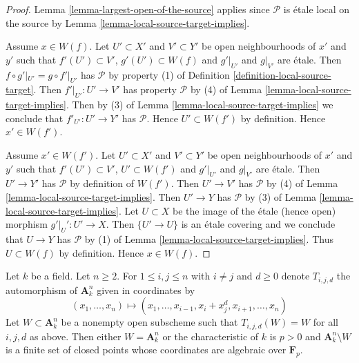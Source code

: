 \begin{proof}
Lemma \ref{lemma-largest-open-of-the-source} applies since
$\mathcal{P}$ is \'etale local on the source by
Lemma \ref{lemma-local-source-target-implies}.

\medskip\noindent
Assume $x \in W(f)$. Let $U' \subset X'$ and $V' \subset Y'$
be open neighbourhoods of $x'$ and $y'$ such that $f'(U') \subset V'$,
$g'(U') \subset W(f)$ and $g'|_{U'}$ and $g|_{V'}$ are \'etale.
Then $f \circ g'|_{U'} = g \circ f'|_{U'}$
has $\mathcal{P}$ by property (1) of
Definition \ref{definition-local-source-target}.
Then $f'|_{U'} : U' \to V'$ has property $\mathcal{P}$
by (4) of Lemma \ref{lemma-local-source-target-implies}.
Then by (3) of Lemma \ref{lemma-local-source-target-implies}
we conclude that $f'_{U'} : U' \to Y'$ has $\mathcal{P}$.
Hence $U' \subset W(f')$ by definition. Hence $x' \in W(f')$.

\medskip\noindent
Assume $x' \in W(f')$. Let $U' \subset X'$ and $V' \subset Y'$
be open neighbourhoods of $x'$ and $y'$ such that $f'(U') \subset V'$,
$U' \subset W(f')$ and $g'|_{U'}$ and $g|_{V'}$ are \'etale.
Then $U' \to Y'$ has $\mathcal{P}$ by definition of $W(f')$.
Then $U' \to V'$ has $\mathcal{P}$ by (4) of
Lemma \ref{lemma-local-source-target-implies}.
Then $U' \to Y$ has $\mathcal{P}$ by (3) of
Lemma \ref{lemma-local-source-target-implies}.
Let $U \subset X$ be the image of the \'etale (hence open)
morphism $g'|_U' : U' \to X$. Then $\{U' \to U\}$
is an \'etale covering and we conclude that
$U \to Y$ has $\mathcal{P}$ by (1) of
Lemma \ref{lemma-local-source-target-implies}.
Thus $U \subset W(f)$ by definition. Hence $x \in W(f)$.
\end{proof}

\begin{lemma}
\label{lemma-orbits}
Let $k$ be a field. Let $n \geq 2$. For $1 \leq i, j \leq n$ with
$i \not = j$ and $d \geq 0$ denote $T_{i, j, d}$ the automorphism
of $\mathbf{A}^n_k$ given in coordinates by
$$
(x_1, \ldots, x_n) \longmapsto
(x_1, \ldots, x_{i - 1}, x_i + x_j^d, x_{i + 1}, \ldots, x_n)
$$
Let $W \subset \mathbf{A}^n_k$ be a nonempty open subscheme
such that $T_{i, j, d}(W) = W$ for all $i, j, d$ as above.
Then either $W = \mathbf{A}^n_k$ or the characteristic of $k$
is $p > 0$ and $\mathbf{A}^n_k \setminus W$ is a finite set
of closed points whose coordinates are algebraic over $\mathbf{F}_p$.
\end{lemma}

